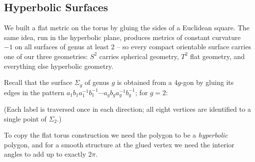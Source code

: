 \documentclass[a4paper]{scrartcl}
\begin{document}
\subsection{Hyperbolic Surfaces}

We built a flat metric on the torus by gluing the sides of a Euclidean square. The same idea, run in the hyperbolic plane, produces metrics of constant curvature $-1$ on all surfaces of genus at least $2$ -- so every compact orientable surface carries one of our three geometries: $S^2$ carries spherical geometry, $T^2$ flat geometry, and everything else hyperbolic geometry.

Recall that the surface $\Sigma_g$ of genus $g$ is obtained from a $4g$-gon by gluing its edges in the pattern $a_1 b_1 a_1^{-1} b_1^{-1} \cdots a_g b_g a_g^{-1} b_g^{-1}$; for $g = 2$:
\begin{center}
\end{center}
(Each label is traversed once in each direction; all eight vertices are identified to a single point of $\Sigma_2$.)

To copy the flat torus construction we need the polygon to be a \emph{hyperbolic} polygon, and for a smooth structure at the glued vertex we need the interior angles to add up to exactly $2\pi$.
\end{document}
